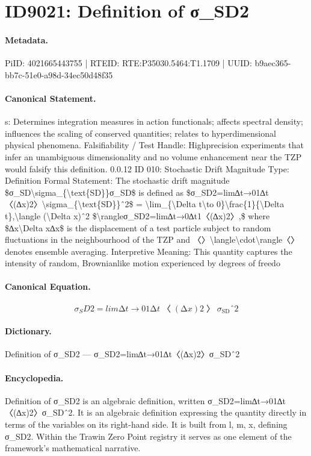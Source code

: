 \section*{ID9021: Definition of σ\_SD2}
\paragraph{Metadata.}
PiID: 4021665443755 | RTEID: RTE:P35030.5464:T1.1709 | UUID: b9aec365-bb7c-51e0-a98d-34ec50d48f35

\paragraph{Canonical Statement.}
s: Determines integration measures in action functionals; affects spectral density; influences the scaling of conserved quantities; relates to hyperdimensional physical phenomena. Falsifiability / Test Handle: Highprecision experiments that infer an unambiguous dimensionality and no volume enhancement near the TZP would falsify this definition. 0.0.12 ID 010: Stochastic Drift Magnitude Type: Definition Formal Statement: The stochastic drift magnitude \$σ\_SD\textbackslash{}sigma\_\{\textbackslash{}text\{SD\}\}σ\_SD\$ is defined as \$σ\_SD2=lim∆t→01∆t〈(∆x)2〉\textbackslash{}sigma\_\{\textbackslash{}text\{SD\}\}ˆ2\$ = \textbackslash{}lim\_\{\textbackslash{}Delta t\textbackslash{}to 0\}\textbackslash{}frac\{1\}\{\textbackslash{}Delta t\},\textbackslash{}langle (\textbackslash{}Delta x)ˆ2 \$\textbackslash{}rangleσ\_SD2=lim∆t→0∆t1〈(∆x)2〉,\$ where \$∆x\textbackslash{}Delta x∆x\$ is the displacement of a test particle subject to random fluctuations in the neighbourhood of the TZP and 〈〉\textbackslash{}langle\textbackslash{}cdot\textbackslash{}rangle〈〉 denotes ensemble averaging. Interpretive Meaning: This quantity captures the intensity of random, Brownianlike motion experienced by degrees of freedo

\paragraph{Canonical Equation.}
\[
σ_SD2=lim∆t→01∆t〈(∆x)2〉\sigma_{\text{SD}}ˆ2
\]

\paragraph{Dictionary.}
Definition of σ\_SD2 — σ\_SD2=lim∆t→01∆t〈(∆x)2〉σ\_SDˆ2

\paragraph{Encyclopedia.}
Definition of σ\_SD2 is an algebraic definition, written σ\_SD2=lim∆t→01∆t〈(∆x)2〉σ\_SDˆ2. It is an algebraic definition expressing the quantity directly in terms of the variables on its right-hand side. It is built from l, m, x, defining σ\_SD2. Within the Trawin Zero Point registry it serves as one element of the framework's mathematical narrative.
